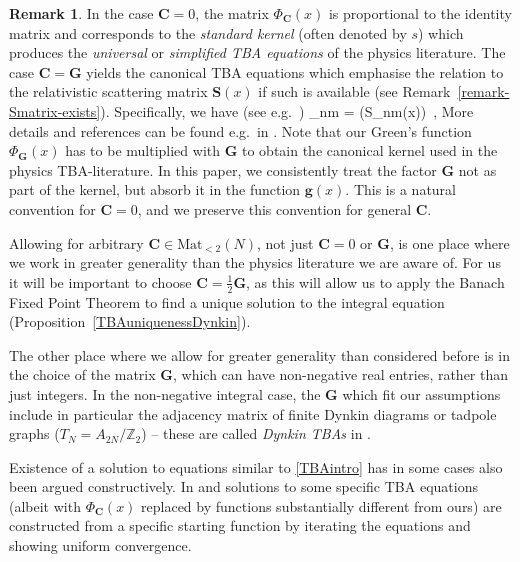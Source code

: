 \documentclass[12pt]{article}
\theoremstyle{plain}
\theoremstyle{definition}
\newtheorem{remark}[theorem]{Remark}
\numberwithin{equation}{section}
\numberwithin{theorem}{section}
\def\be#1\ee{\begin{equation}#1\end{equation}}
\renewcommand{\vec}[1]{\mathbf{#1}}
\begin{document}
\begin{remark} \label{remark-S-matrix-relation}
In the case $\vec{C}=0$, the matrix $\Phi_{\vec C}(x)$ is
proportional to the identity matrix
and corresponds to the \textsl{standard kernel} 
(often denoted by $s$) which produces the
\textsl{universal} or \textsl{simplified TBA equations}
of the physics literature.
The case $\vec{C}=\vec{G}$ yields the canonical TBA equations which emphasise the relation to the relativistic
scattering matrix $\vec{S}(x)$ if such is available (see Remark~\ref{remark-Smatrix-exists}).
Specifically, we have (see e.g.\ \cite{Dorey:2007zx})
\be\label{PhiG-logS}
\left[\Phi_{\vec G}(x)\cdot \vec{G}\right]_{nm} = \log\left(S_{nm}(x)\right)\ ,
\ee
More details and references can be found e.g.\ in \cite{Zamo:ADE,Tateo:DynkinTBAs,vanTongeren:TBAreview}.
Note that our Green's function $\Phi_{\vec G}(x)$ has to be multiplied with $\vec{G}$ to obtain the canonical kernel used in the physics TBA-literature.
In this paper, we consistently treat the factor $\vec{G}$ not as part of the kernel, but absorb it in the function $\vec{g}(x)$. This is a natural convention for $\vec{C}=0$, and we preserve this convention for general $\vec{C}$.
\end{remark}

Allowing for arbitrary $\vec{C} \in \mathrm{Mat}_{<2}(N)$,
not just $\vec C = 0$ or $\vec G$, is one place where we work in greater generality 
than the physics literature we are aware of.
For us it will be important to choose $\vec{C} = \tfrac 12 \vec{G}$, as this will allow us to apply the Banach Fixed Point Theorem to find a unique solution to the integral equation (Proposition~\ref{TBAuniquenessDynkin}).

The other place where we allow for greater generality than considered before is in the choice of the matrix $\vec G$, which can have non-negative real entries, rather than 
	just
integers. 
In the non-negative integral case, the $\vec{G}$ which fit our assumptions include in particular the adjacency matrix of finite Dynkin diagrams  
or tadpole graphs ($T_N=A_{2N}/\mathbb{Z}_2$) -- these are called \textsl{Dynkin TBAs} in \cite{Tateo:DynkinTBAs}.

\medskip

Existence of a solution to equations similar to \eqref{TBAintro} has in some cases also been argued constructively. In \cite{YangYang69} and \cite{Lai} solutions to some specific TBA equations (albeit with $\Phi_{\vec{C}}(x)$ replaced by functions substantially different from ours) are constructed from a specific starting function by iterating the equations and showing uniform convergence.
\end{document}
